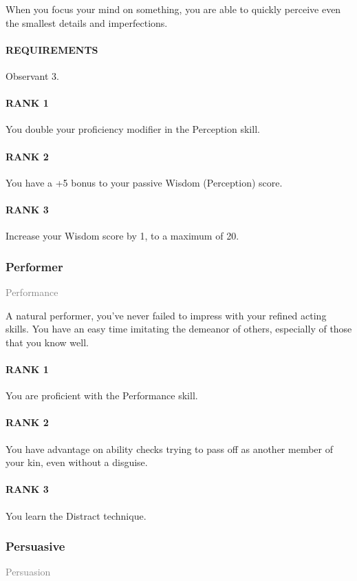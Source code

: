 \normalsize
When you focus your mind on something, you are able to quickly perceive even the smallest details and imperfections.
\paragraph{REQUIREMENTS} Observant 3.
\paragraph{RANK 1} You double your proficiency modifier in the Perception skill.
\paragraph{RANK 2} You have a +5 bonus to your passive Wisdom (Perception) score.
\paragraph{RANK 3} Increase your Wisdom score by 1, to a maximum of 20.

\subsubsection{Performer} \label{feat::performer}
\small{\textcolor{gray}{Performance}}

\normalsize
A natural performer, you've never failed to impress with your refined acting skills.
You have an easy time imitating the demeanor of others, especially of those that you know well.
\paragraph{RANK 1} You are proficient with the Performance skill.
\paragraph{RANK 2} You have advantage on ability checks trying to pass off as another member of your kin, even without a disguise.
\paragraph{RANK 3} You learn the Distract technique.

\subsubsection{Persuasive} \label{feat::persuasive}
\small{\textcolor{gray}{Persuasion}}

